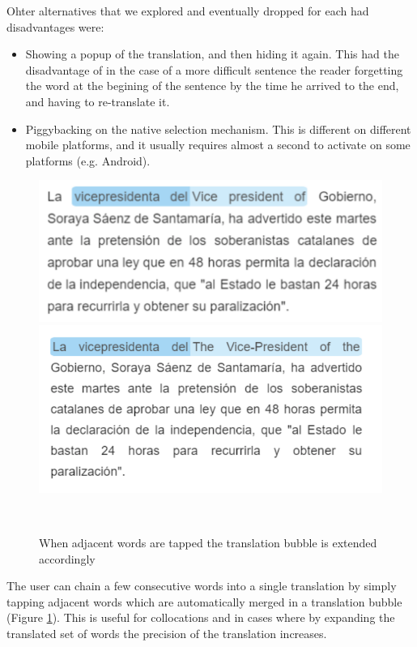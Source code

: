 Ohter alternatives that we explored and eventually dropped for each had disadvantages were: 
\begin{itemize}

  \item Showing a popup of the translation, and then hiding it again. This had the disadvantage of in the case of a more difficult sentence the reader forgetting the word at the begining of the sentence by the time he arrived to the end, and having to re-translate it. 

  \item Piggybacking on the native selection mechanism. This is different on different mobile platforms, and it usually requires almost a second to activate on some platforms (e.g. Android).
\end{itemize}

\begin{figure}[h!]
\centering
  \includegraphics[width=0.8\columnwidth]{figures/translated_words1}
  \includegraphics[width=0.8\columnwidth]{figures/translated_words2}
  \caption{When adjacent words are tapped the translation bubble is extended accordingly}~\label{fig:translation_extension}
\end{figure}

The user can chain a few consecutive words into a single translation by simply tapping adjacent words which are automatically merged in a translation bubble (Figure \ref{fig:translation_extension}). This is useful for collocations and in cases where by expanding the translated set of words the precision of the translation increases. 

